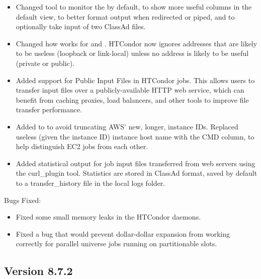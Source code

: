 \begin{itemize}

\item Changed  tool
to monitor the  by default,
to show more useful columns in the default view,
to better format output when redirected or piped, and
to optionally take input of two ClassAd files.

\item Changed how  works for  and
.  HTCondor now ignores addresses that are likely
to be useless (loopback or link-local) unless no address is likely to be
useful (private or public).

\item Added support for Public Input Files in HTCondor jobs. This allows
users to transfer input files over a publicly-available HTTP web service,
which can benefit from caching proxies, load balancers, and other tools
to improve file transfer performance.

\item Added  to  to avoid truncating AWS' new,
longer, instance IDs.  Replaced useless (given the instance ID) instance
host name with the CMD column, to help distinguish EC2 jobs from each other.

\item Added statistical output for job input files transferred from web servers
using the curl\_plugin tool. Statistics are stored in ClassAd format, saved by
default to a transfer\_history file in the local logs folder.

\end{itemize}

\noindent Bugs Fixed:

\begin{itemize}

\item Fixed some small memory leaks in the HTCondor daemons.

\item Fixed a bug that would prevent dollar-dollar expansion from
working correctly for parallel universe jobs running on partitionable
slots.

\end{itemize}

\subsection*{\label{sec:New-8-7-2}Version 8.7.2}

